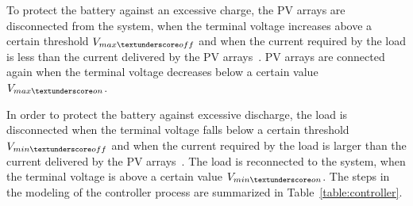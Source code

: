 \documentclass[journal]{IEEEtran}
\begin{document}
To protect the battery against an excessive charge, the PV arrays are disconnected from the system, when the terminal voltage increases above a certain threshold $V_{max \textunderscore off}$ and when the current required by the load is less than the current delivered by the PV arrays~\cite{Hansen}. PV arrays are connected again when the terminal voltage decreases below a certain value $ V_{max \textunderscore on} $. 
%

In order to protect the battery against excessive discharge, the load is disconnected when the terminal voltage falls below a certain threshold $V_{min \textunderscore off}$ and when the current required by the load is larger than the current delivered by the PV arrays~\cite{Hansen}. The load is reconnected to the system, when the terminal voltage is above a certain value $V_{min \textunderscore on}$.
%
%
%
The steps in the modeling of the controller process are summarized in Table~\ref{table:controller}.
\end{document}
